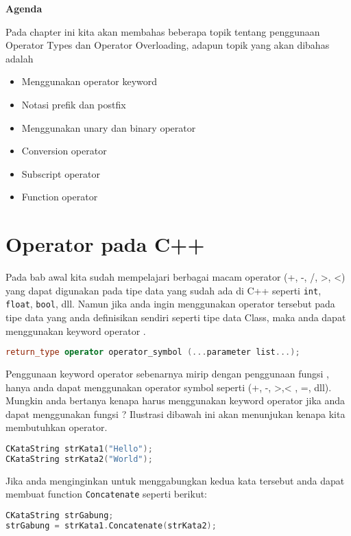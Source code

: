\textbf{Agenda}

Pada chapter ini kita akan membahas beberapa topik tentang penggunaan
Operator Types dan Operator Overloading, adapun topik yang akan dibahas
adalah

\begin{itemize}
\tightlist
\item
  Menggunakan operator keyword
\item
  Notasi prefik dan postfix
\item
  Menggunakan unary dan binary operator
\item
  Conversion operator
\item
  Subscript operator
\item
  Function operator
\end{itemize}

\section{Operator pada C++}\label{operator-pada-c}

Pada bab awal kita sudah mempelajari berbagai macam operator (+, -, /,
\textgreater{}, \textless{}) yang dapat digunakan pada tipe data yang
sudah ada di C++ seperti \texttt{int}, \texttt{float}, \texttt{bool},
dll. Namun jika anda ingin menggunakan operator tersebut pada tipe data
yang anda definisikan sendiri seperti tipe data Class, maka anda dapat
menggunakan keyword operator .

\begin{lstlisting}[language=c++]
return_type operator operator_symbol (...parameter list...);
\end{lstlisting}

Penggunaan keyword operator sebenarnya mirip dengan penggunaan fungsi ,
hanya anda dapat menggunakan operator symbol seperti (+, -,
\textgreater{},\textless{} , =, dll). Mungkin anda bertanya kenapa harus
menggunakan keyword operator jika anda dapat menggunakan fungsi ?
Ilustrasi dibawah ini akan menunjukan kenapa kita membutuhkan operator.

\begin{lstlisting}[language=c++]
CKataString strKata1("Hello");
CKataString strKata2("World");
\end{lstlisting}

Jika anda menginginkan untuk menggabungkan kedua kata tersebut anda
dapat membuat function \texttt{Concatenate} seperti berikut:

\begin{lstlisting}[language=c++]
CKataString strGabung;
strGabung = strKata1.Concatenate(strKata2);
\end{lstlisting}

